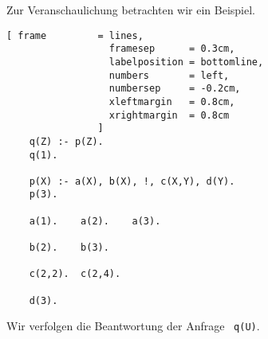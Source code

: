 Zur Veranschaulichung betrachten wir ein Beispiel.
\begin{Verbatim}[ frame         = lines, 
                  framesep      = 0.3cm, 
                  labelposition = bottomline,
                  numbers       = left,
                  numbersep     = -0.2cm,
                  xleftmargin   = 0.8cm,
                  xrightmargin  = 0.8cm
                ]
    q(Z) :- p(Z).
    q(1).

    p(X) :- a(X), b(X), !, c(X,Y), d(Y).    
    p(3).
    
    a(1).    a(2).    a(3).
    
    b(2).    b(3).
    
    c(2,2).  c(2,4).
    
    d(3).
\end{Verbatim}
Wir verfolgen die Beantwortung der Anfrage \ \texttt{q(U)}. 
